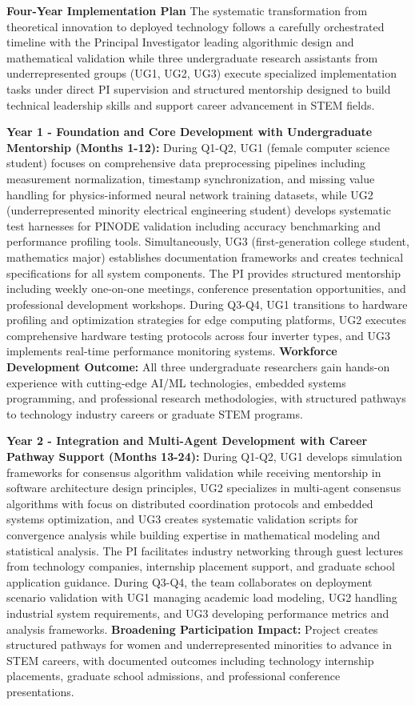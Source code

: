 \documentclass[12pt]{article}
\begin{document}
\textbf{Four-Year Implementation Plan} The systematic transformation from theoretical innovation to deployed technology follows a carefully orchestrated timeline with the Principal Investigator leading algorithmic design and mathematical validation while three undergraduate research assistants from underrepresented groups (UG1, UG2, UG3) execute specialized implementation tasks under direct PI supervision and structured mentorship designed to build technical leadership skills and support career advancement in STEM fields.

\textbf{Year 1 - Foundation and Core Development with Undergraduate Mentorship (Months 1-12):} During Q1-Q2, UG1 (female computer science student) focuses on comprehensive data preprocessing pipelines including measurement normalization, timestamp synchronization, and missing value handling for physics-informed neural network training datasets, while UG2 (underrepresented minority electrical engineering student) develops systematic test harnesses for PINODE validation including accuracy benchmarking and performance profiling tools. Simultaneously, UG3 (first-generation college student, mathematics major) establishes documentation frameworks and creates technical specifications for all system components. The PI provides structured mentorship including weekly one-on-one meetings, conference presentation opportunities, and professional development workshops. During Q3-Q4, UG1 transitions to hardware profiling and optimization strategies for edge computing platforms, UG2 executes comprehensive hardware testing protocols across four inverter types, and UG3 implements real-time performance monitoring systems. \textbf{Workforce Development Outcome:} All three undergraduate researchers gain hands-on experience with cutting-edge AI/ML technologies, embedded systems programming, and professional research methodologies, with structured pathways to technology industry careers or graduate STEM programs.

\textbf{Year 2 - Integration and Multi-Agent Development with Career Pathway Support (Months 13-24):} During Q1-Q2, UG1 develops simulation frameworks for consensus algorithm validation while receiving mentorship in software architecture design principles, UG2 specializes in multi-agent consensus algorithms with focus on distributed coordination protocols and embedded systems optimization, and UG3 creates systematic validation scripts for convergence analysis while building expertise in mathematical modeling and statistical analysis. The PI facilitates industry networking through guest lectures from technology companies, internship placement support, and graduate school application guidance. During Q3-Q4, the team collaborates on deployment scenario validation with UG1 managing academic load modeling, UG2 handling industrial system requirements, and UG3 developing performance metrics and analysis frameworks. \textbf{Broadening Participation Impact:} Project creates structured pathways for women and underrepresented minorities to advance in STEM careers, with documented outcomes including technology internship placements, graduate school admissions, and professional conference presentations.
\end{document}
